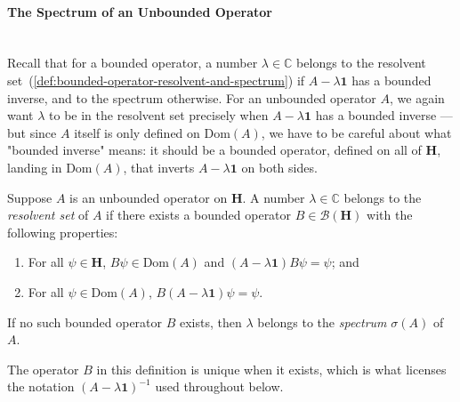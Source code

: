 \paragraph{The Spectrum of an Unbounded Operator}\mbox{}\\
Recall that for a bounded operator, a number $\lambda \in \mathbb{C}$ belongs to the resolvent set~(\ref{def:bounded-operator-resolvent-and-spectrum}) if $A - \lambda \mathbf{1}$ has a bounded inverse, and to the spectrum otherwise. For an unbounded operator $A$, we again want $\lambda$ to be in the resolvent set precisely when $A - \lambda \mathbf{1}$ has a bounded inverse — but since $A$ itself is only defined on $\text{Dom}(A)$, we have to be careful about what "bounded inverse" means: it should be a bounded operator, defined on all of $\mathbf{H}$, landing in $\text{Dom}(A)$, that inverts $A - \lambda \mathbf{1}$ on both sides.

\begin{definition}
    \label{def:hall-9.16}
    \leanok
    Suppose $A$ is an unbounded operator on $\mathbf{H}$. A number $\lambda \in \mathbb{C}$ belongs to the \textit{resolvent set} of $A$ if there exists a bounded operator $B \in \mathcal{B}(\mathbf{H})$ with the following properties:
    \begin{enumerate}
        \item For all $\psi \in \mathbf{H}$, $B\psi \in \text{Dom}(A)$ and $(A - \lambda \mathbf{1})B\psi = \psi$; and
        \item For all $\psi \in \text{Dom}(A)$, $B(A - \lambda \mathbf{1})\psi = \psi$.
    \end{enumerate}
    If no such bounded operator $B$ exists, then $\lambda$ belongs to the \textit{spectrum} $\sigma(A)$ of $A$.
\end{definition}

The operator $B$ in this definition is unique when it exists, which is what licenses the notation $(A - \lambda\mathbf{1})^{-1}$ used throughout below.

